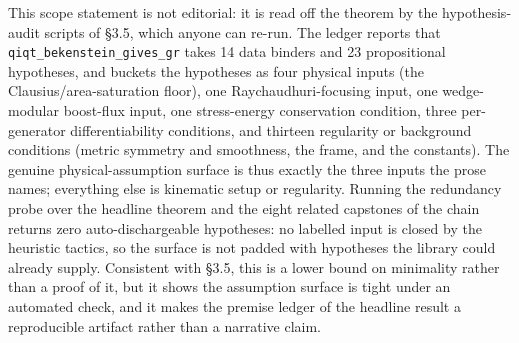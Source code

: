 \documentclass[11pt]{article}
\begin{document}
This scope statement is not editorial: it is read off the theorem by the hypothesis-audit scripts of
§3.5, which anyone can re-run. The ledger reports that \texttt{qiqt\_bekenstein\_gives\_gr} takes 14
data binders and 23 propositional hypotheses, and buckets the hypotheses as four physical inputs (the
Clausius/area-saturation floor), one Raychaudhuri-focusing input, one wedge-modular boost-flux input,
one stress-energy conservation condition, three per-generator differentiability conditions, and
thirteen regularity or background conditions (metric symmetry and smoothness, the frame, and the
constants). The genuine physical-assumption surface is thus exactly the three inputs the prose names;
everything else is kinematic setup or regularity. Running the redundancy probe over the headline
theorem and the eight related capstones of the chain returns zero auto-dischargeable hypotheses: no
labelled input is closed by the heuristic tactics, so the surface is not padded with hypotheses the
library could already supply. Consistent with §3.5, this is a lower bound on minimality rather than a
proof of it, but it shows the assumption surface is tight under an automated check, and it makes the
premise ledger of the headline result a reproducible artifact rather than a narrative claim.
\end{document}
